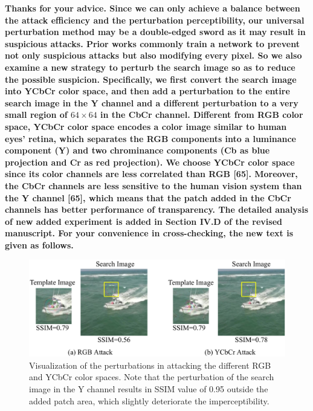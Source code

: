 \documentclass[12pt]{article}
\begin{document}
\textbf{
Thanks for your advice.
Since we can only achieve a balance between the attack efficiency and the perturbation perceptibility, our universal perturbation method may be a double-edged sword as it may result in suspicious attacks. Prior works commonly train a network to prevent not only suspicious attacks but also modifying every pixel. So we also examine a new strategy to perturb the search image so as to reduce the possible suspicion. Specifically, we first convert the search image into YCbCr color space, and then add a perturbation to the entire search image in the Y channel and a different perturbation to a very small region of $64 \times 64$ in the CbCr channel. Different from RGB color space, YCbCr color space encodes a color image similar to human eyes’ retina, which separates the RGB components into a luminance component (Y) and two chrominance components (Cb as blue projection and Cr as red projection). We choose YCbCr color space since its color channels are less correlated than RGB [65]. Moreover, the CbCr channels are less sensitive to the human vision system than the Y channel [65], which means that the patch added in the CbCr channels has better performance of transparency.
The detailed analysis of new added experiment is added in Section IV.D of the revised manuscript.
For your convenience in cross-checking, the new text is given as follows.}

\begin{figure}[t]
  \renewcommand\thefigure{8}
  \centering
  \includegraphics[width=.8\textwidth]{images_imperceptible/1.pdf}
  \caption{Visualization of the perturbations in attacking the different RGB and YCbCr color spaces. Note that the perturbation of the search image in the Y channel results in SSIM value of 0.95 outside the added patch area, which slightly deteriorate the imperceptibility.}
  \label{fig:YCbCr}
\end{figure}
\end{document}
